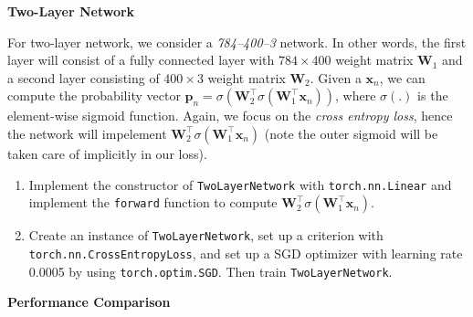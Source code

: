 \documentclass[11pt]{article}
\begin{document}
\vspace{10pt} {\large \textbf{Two-Layer Network} }

For two-layer network, we consider a \emph{784--400--3} network. In other words, the first layer will consist of a fully connected layer with $784 \times 400$ weight matrix $\mathbf{W}_1$ and a second layer consisting of $400 \times 3$ weight matrix $\mathbf{W}_2$. Given a $\mathbf{x}_n$, we can compute the probability vector $\mathbf{p}_n = \sigma(\mathbf{W}_2^\top \sigma(\mathbf{W}_1^\top \mathbf{x}_n))$, where $\sigma(.)$ is the element-wise sigmoid function. Again, we focus on the \emph{cross entropy loss}, hence the network will impelement $\mathbf{W}_2^\top \sigma(\mathbf{W}_1^\top \mathbf{x}_n)$ (note the outer sigmoid will be taken care of implicitly in our loss).


\begin{enumerate}[resume]
\item Implement the constructor of \verb|TwoLayerNetwork| with \verb|torch.nn.Linear| and implement the \verb|forward| function to compute $\mathbf{W}_2^\top \sigma(\mathbf{W}_1^\top \mathbf{x}_n)$. 

\solution{}

\item Create an instance of \verb|TwoLayerNetwork|, set up a criterion with \verb|torch.nn.CrossEntropyLoss|, and set up a SGD optimizer with learning rate 0.0005 by using \verb|torch.optim.SGD|. Then train \verb|TwoLayerNetwork|. 

\solution{}

\end{enumerate}

\vspace{10pt} {\large \textbf{Performance Comparison} }
\end{document}
